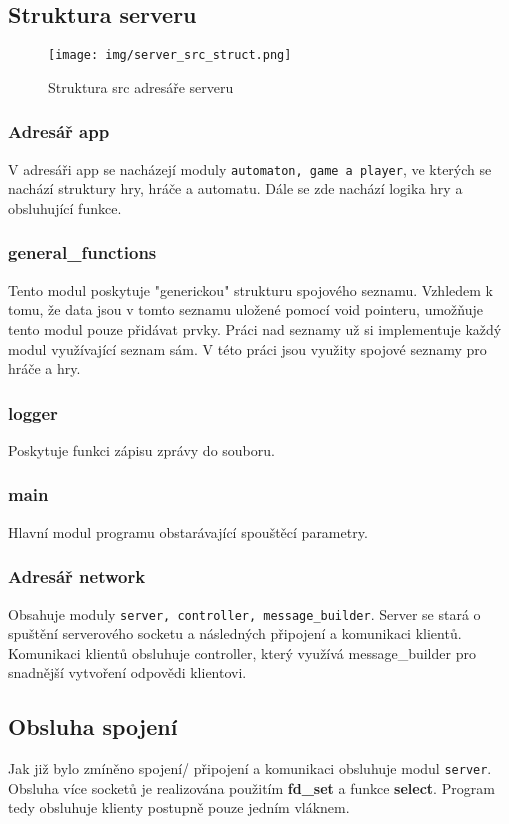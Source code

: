 \documentclass[12pt]{report}
\begin{document}
\subsection{Struktura serveru}
\begin{figure}[H]
	\centering
	\texttt{[image: img/server\_src\_struct.png]}
	\caption{Struktura src adresáře serveru}
	\label{img:server_src_struct}
\end{figure}

\subsubsection{Adresář app}
V adresáři app se nacházejí moduly \texttt{automaton, game a player}, ve kterých se nachází struktury 
hry, hráče a automatu. Dále se zde nachází logika hry a obsluhující funkce.
\subsubsection{general\_functions}
Tento modul poskytuje "generickou" strukturu spojového seznamu. Vzhledem k tomu, že data jsou v 
tomto seznamu uložené pomocí void pointeru, umožňuje tento modul pouze přidávat prvky. Práci nad
seznamy už si implementuje každý modul využívající seznam sám. V této práci jsou využity spojové
seznamy pro hráče a hry.
\subsubsection{logger}
Poskytuje funkci zápisu zprávy do souboru.
\subsubsection{main}
Hlavní modul programu obstarávající spouštěcí parametry.
\subsubsection{Adresář network}
Obsahuje moduly \texttt{server, controller, message\_builder}. Server se stará o spuštění
serverového socketu a následných připojení a komunikaci klientů. Komunikaci klientů obsluhuje
controller, který využívá message\_builder pro snadnější vytvoření odpovědi klientovi.

\subsection{Obsluha spojení}
Jak již bylo zmíněno spojení/ připojení a komunikaci obsluhuje modul \texttt{server}. Obsluha více
socketů je realizována použitím \textbf{fd\_set} a funkce \textbf{select}. Program tedy obsluhuje
klienty postupně pouze jedním vláknem.
%
\end{document}
